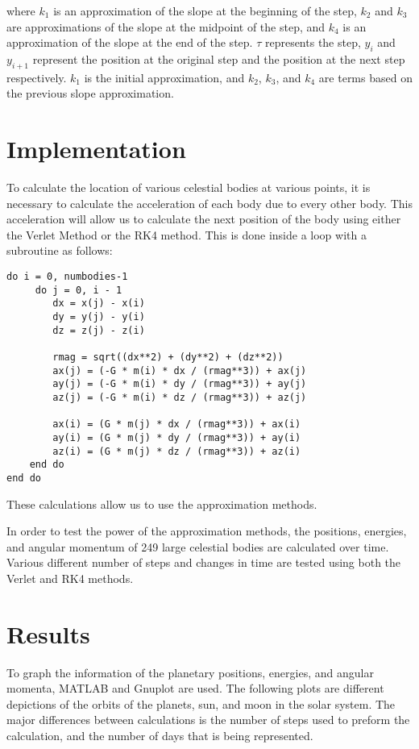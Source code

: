 \documentclass{article}
\begin{document}
\begin{multicols}{2}
\vspace{0.1in}

where $k_1$ is an approximation of the slope at the beginning of the step, $k_2$ and $k_3$ are approximations of the slope at the midpoint of the step, and $k_4$ is an approximation of the slope at the end of the step. $\tau$ represents the step, $y_i$ and $y_{i+1}$ represent the position at the original step and the position at the next step respectively. $k_1$ is the initial approximation, and $k_2$, $k_3$, and $k_4$ are terms based on the previous slope approximation.

\section{Implementation}
To calculate the location of various celestial bodies at various points, it is necessary to calculate the acceleration of each body due to every other body. This acceleration will allow us to calculate the next position of the body using either the Verlet Method or the RK4 method. This is done inside a loop with a subroutine as follows:

\begin{verbatim}
do i = 0, numbodies-1
     do j = 0, i - 1
        dx = x(j) - x(i)
        dy = y(j) - y(i)
        dz = z(j) - z(i)

        rmag = sqrt((dx**2) + (dy**2) + (dz**2))
        ax(j) = (-G * m(i) * dx / (rmag**3)) + ax(j) 
        ay(j) = (-G * m(i) * dy / (rmag**3)) + ay(j)
        az(j) = (-G * m(i) * dz / (rmag**3)) + az(j)

        ax(i) = (G * m(j) * dx / (rmag**3)) + ax(i)
        ay(i) = (G * m(j) * dy / (rmag**3)) + ay(i)
        az(i) = (G * m(j) * dz / (rmag**3)) + az(i)
    end do
end do
\end{verbatim}

These calculations allow us to use the approximation methods.

In order to test the power of the approximation methods, the positions, energies, and angular momentum of 249 large celestial bodies are calculated over time. Various different number of steps and changes in time are tested using both the Verlet and RK4 methods.

\section{Results}
To graph the information of the planetary positions, energies, and angular momenta, MATLAB and Gnuplot are used. The following plots are different depictions of the orbits of the planets, sun, and moon in the solar system. The major differences between calculations is the number of steps used to preform the calculation, and the number of days that is being represented.



\end{multicols}
\end{document}
